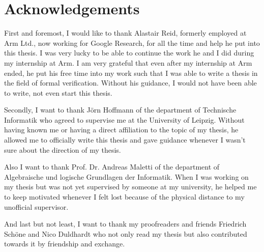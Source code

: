 \chapter*{\centering Acknowledgements}

First and foremost, I would like to thank Alastair Reid, formerly employed at Arm Ltd., now working for Google Research, for all the time and help he put into this thesis.
I was very lucky to be able to continue the work he and I did during my internship at Arm.
I am very grateful that even after my internship at Arm ended, he put his free time into my work such that I was able to write a thesis in the field of formal verification.
Without his guidance, I would not have been able to write, not even start this thesis.

Secondly, I want to thank Jörn Hoffmann of the department of Technische Informatik who agreed to supervise me at the University of Leipzig.
Without having known me or having a direct affiliation to the topic of my thesis, he allowed me to officially write this thesis and gave guidance whenever I wasn't sure about the direction of my thesis.

Also I want to thank Prof. Dr. Andreas Maletti of the department of Algebraische und logische Grundlagen der Informatik.
When I was working on my thesis but was not yet supervised by someone at my university, he helped me to keep motivated whenever I felt lost because of the physical distance to my unofficial supervisor.

And last but not least, I want to thank my proofreaders and friends Friedrich Schöne and Nico Duldhardt who not only read my thesis but also contributed towards it by friendship and exchange.
